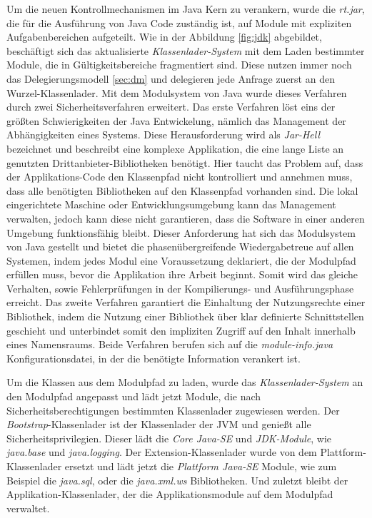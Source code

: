     Um die neuen Kontrollmechanismen im Java Kern zu verankern, wurde die \textit{rt.jar}, die für die Ausführung von Java Code zuständig ist, auf Module mit expliziten Aufgabenbereichen aufgeteilt. Wie in der Abbildung \ref{fig:jdk} abgebildet, beschäftigt sich das aktualisierte \textit{Klassenlader-System} mit dem Laden bestimmter Module, die in Gültigkeitsbereiche fragmentiert sind. Diese nutzen immer noch das Delegierungsmodell \ref{sec:dm} und delegieren jede Anfrage zuerst an den Wurzel-Klassenlader. Mit dem Modulsystem von Java wurde dieses Verfahren durch zwei Sicherheitsverfahren erweitert. Das erste Verfahren löst eins der größten Schwierigkeiten der Java Entwickelung, nämlich das Management der Abhängigkeiten eines Systems. Diese Herausforderung wird als \textit{Jar-Hell} bezeichnet und beschreibt eine komplexe Applikation, die eine lange Liste an genutzten Drittanbieter-Bibliotheken benötigt. Hier taucht das Problem auf, dass der Applikations-Code den Klassenpfad nicht kontrolliert und annehmen muss, dass alle benötigten Bibliotheken auf den Klassenpfad vorhanden sind. Die lokal eingerichtete Maschine oder Entwicklungsumgebung kann das Management verwalten, jedoch kann diese nicht garantieren, dass die Software in einer anderen Umgebung funktionsfähig bleibt.\newline
    Dieser Anforderung hat sich das Modulsystem von Java gestellt und bietet die phasenübergreifende Wiedergabetreue auf allen Systemen, indem jedes Modul eine Voraussetzung deklariert, die der Modulpfad erfüllen muss, bevor die Applikation ihre Arbeit beginnt. Somit wird das gleiche Verhalten, sowie Fehlerprüfungen in der Kompilierungs- und Ausführungsphase erreicht.\newline
    Das zweite Verfahren garantiert die Einhaltung der Nutzungsrechte einer Bibliothek, indem die Nutzung einer Bibliothek über klar definierte Schnittstellen geschieht und unterbindet somit den impliziten Zugriff auf den Inhalt innerhalb eines Namensraums. Beide Verfahren berufen sich auf die \textit{module-info.java} Konfigurationsdatei, in der die benötigte Information verankert ist. \bigbreak

    Um die Klassen aus dem Modulpfad zu laden, wurde das \textit{Klassenlader-System} an den Modulpfad angepasst und lädt jetzt Module, die nach Sicherheitsberechtigungen bestimmten Klassenlader zugewiesen werden. Der \textit{Bootstrap}-Klassenlader ist der Klassenlader der JVM und genießt alle Sicherheitsprivilegien. Dieser lädt die \textit{Core Java-SE} und \textit{JDK-Module}, wie \textit{java.base} und \textit{java.logging}. Der Extension-Klassenlader wurde von dem Plattform-Klassenlader ersetzt und lädt jetzt die \textit{Plattform Java-SE} Module, wie zum Beispiel die \textit{java.sql}, oder die \textit{java.xml.ws} Bibliotheken. Und zuletzt bleibt der Applikation-Klassenlader, der die Applikationsmodule auf dem Modulpfad verwaltet. \cite{classLoadingOracle,modulMitJava9,java9modRevealed}

